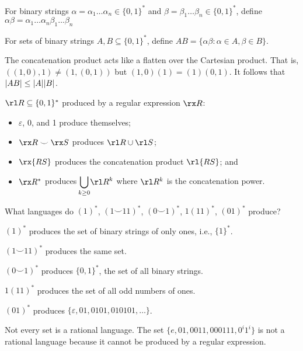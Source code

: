 \documentclass[class=math239,notes]{agony}
\begin{document}
\begin{defn}
  For binary strings $\alpha = \alpha_1\dots\alpha_n \in \{0,1\}^*$
  and $\beta = \beta_1\dots\beta_n \in \{0,1\}^*$, define
  $\alpha\beta = \alpha_1\dots\alpha_n\beta_1\dots\beta_n$

  For sets of binary strings $A,B \subseteq \{0,1\}^*$,
  define $AB = \{ \alpha\beta : \alpha \in A, \beta \in B\}$.
\end{defn}

\begin{remark}
  The concatenation product acts like a flatten over the Cartesian product.
  That is, $((1,0),1) \neq (1,(0,1))$ but $(1,0)(1) = (1)(0,1)$.
  It follows that $\abs{AB} \leq \abs{A}\abs{B}$.
\end{remark}

\begin{defn}
  $\rl R \subseteq \{0,1\}^*$ produced by a regular expression $\rx R$:
  \begin{itemize}[nosep]
    \item $\varepsilon$, 0, and 1 produce themselves;
    \item $\rx R\smile \rx S$ produces $\rl R \cup \rl S$;
    \item $\rx{RS}$ produces the concatenation product $\rl{RS}$; and
    \item $\rx R^*$ produces $\smashoperator{\bigcup_{k\geq 0}} \rl R^k$ where $\rl R^k$ is the concatenation power.
  \end{itemize}
\end{defn}

\begin{example}
  What languages do $(1)^*$, $(1 \smile 11)^*$, $(0 \smile 1)^*$, $1(11)^*$, $(01)^*$ produce?
\end{example}
\begin{sol}
  $(1)^*$ produces the set of binary strings of only ones, i.e., $\{1\}^*$.

  $(1 \smile 11)^*$ produces the same set.

  $(0 \smile 1)^*$ produces $\{0,1\}^*$, the set of all binary strings.

  $1(11)^*$ produces the set of all odd numbers of ones.

  $(01)^*$ produces $\{\varepsilon, 01, 0101, 010101, \dotsc\}$.
\end{sol}

\begin{example}
  Not every set is a rational language.
  The set $\{e,01,0011,000111,0^i1^i\}$ is not a rational language
  because it cannot be produced by a regular expression.
\end{example}
\end{document}
